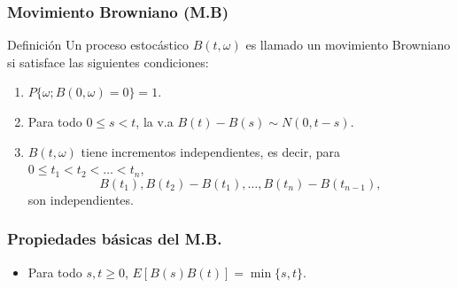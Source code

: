 \begin{frame}
	\frametitle{Movimiento Browniano (M.B)}
	\begin{block}{Definici\'on}
		Un proceso estoc\'astico $B(t,\omega)$ es llamado un movimiento Browniano si satisface las 			siguientes condiciones:
		\begin{enumerate}
			\item $P\{\omega;B(0,\omega)=0\}=1$.
			\item Para todo $0\leq s < t$, la v.a $B(t) - B(s)\sim N(0,t -s)$.
			\item $B(t,\omega)$ tiene incrementos independientes, es decir, para 
				$0\leq t_{1} < t_{2}	<\ldots < t_{n}$,
				\begin{equation*}
					B(t_{1}), B(t_{2}) - B(t_{1}),\ldots,B(t_{n}) - B(t_{n-1}),
				\end{equation*}
				son independientes.
		\end{enumerate}
	\end{block}
\end{frame}
\begin{frame}
	\frametitle{Propiedades b\'asicas del M.B.}
	\begin{exampleblock}{}
		\begin{itemize}
			\item Para todo $s,t\geq 0$, $E[B(s)B(t)]=\min\{s,t\}$.
		\end{itemize}
	\end{exampleblock}
\end{frame}
